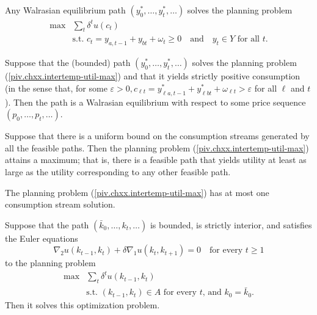 \addtocounter{equation}{6}
\begin{prop}
    Any Walrasian equilibrium path $(y^*_0, \dots, y^*_t, \dots)$ solves the planning problem
    \begin{equation}\label{piv.chxx.intertemp-util-max}
        \begin{aligned}
            \max &\sum_t \delta^t u(c_t) \\
            &\text{s.t. } c_t = y_{a, t - 1} + y_{bt} + \omega_t \geq 0 \quad \text{and} \quad y_t \in Y \text{ for all } t.
        \end{aligned}
    \end{equation}
\end{prop}

\begin{prop}
    Suppose that the (bounded) path $(y^*_0, \dots, y^*_t, \dots)$ solves the planning problem (\ref{piv.chxx.intertemp-util-max}) and that it yields strictly positive consumption (in the sense that, for some $\varepsilon > 0, c_{\ell t} = y^*_{\ell a, t - 1} + y^*_{\ell bt} + \omega_{\ell t} > \varepsilon$ for all $\ell$ and $t$). Then the path is a Walrasian equilibrium with respect to some price sequence $(p_0, \dots, p_t, \dots)$.
\end{prop}

\begin{prop}
    Suppose that there is a uniform bound on the consumption streams generated by all the feasible paths. Then the planning problem (\ref{piv.chxx.intertemp-util-max}) attains a maximum; that is, there is a feasible path that yields utility at least as large as the utility corresponding to any other feasible path.
\end{prop}

\begin{prop}
    The planning problem (\ref{piv.chxx.intertemp-util-max}) has at most one consumption stream solution.
\end{prop}

\begin{prop}
    Suppose that the path $(\bar{k}_0, \dots, k_t, \dots)$ is bounded, is strictly interior, and satisfies the Euler equations
    \begin{equation*}
        \nabla_2 u(k_{t - 1}, k_t) + \delta \nabla_1 u(k_t, k_{t + 1}) = 0 \quad \text{for every } t \geq 1
    \end{equation*}
    to the planning problem
    \begin{equation*}
        \begin{aligned}
            \max &\sum_t \delta^t u(k_{t - 1}, k_t) \\
            &\text{s.t. } (k_{t - 1}, k_t) \in A \text{ for every } t \text{, and } k_0 = \bar{k}_0.
        \end{aligned}
    \end{equation*}
    Then it solves this optimization problem.
\end{prop}


